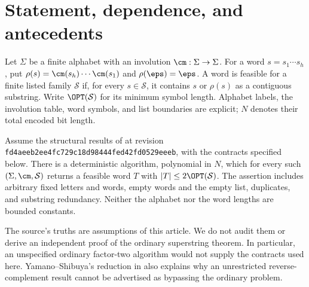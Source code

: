 \section{Statement, dependence, and antecedents}\label{sec:scope}
Let $\Sigma$ be a finite alphabet with an involution $\cm:\Sigma\to\Sigma$.
For a word $s=s_1\cdots s_h$, put
$\rho(s)=\cm(s_h)\cdots\cm(s_1)$ and $\rho(\eps)=\eps$.
A word is feasible for a finite listed family $\mathcal S$ if, for every
$s\in\mathcal S$, it contains $s$ or $\rho(s)$ as a contiguous substring.
Write $\OPT(\mathcal S)$ for its minimum symbol length. Alphabet labels,
the involution table, word symbols, and list boundaries are explicit;
$N$ denotes their total encoded bit length.

\begin{theorem}\label{thm:main}
Assume the structural results of \cite{ordinary} at revision
\textnormal{\texttt{fd4aeeb2ee4fc729c18d98444fed42fd0529eeeb}}, with the contracts
specified below. There is a deterministic algorithm, polynomial in $N$,
which for every such $(\Sigma,\cm,\mathcal S)$ returns a feasible word $T$
with $|T|\le2\OPT(\mathcal S)$. The assertion includes arbitrary fixed
letters and words, empty words and the empty list, duplicates, and substring
redundancy. Neither the alphabet nor the word lengths are bounded constants.
\end{theorem}

The source's truths are assumptions of this article. We do not audit them
or derive an independent proof of the ordinary superstring theorem.
In particular, an unspecified ordinary factor-two algorithm would not
supply the contracts used here. Yamano--Shibuya's reduction in
\cite[Theorem 2]{yswabi} also explains why an unrestricted reverse-complement
result cannot be advertised as bypassing the ordinary problem.

